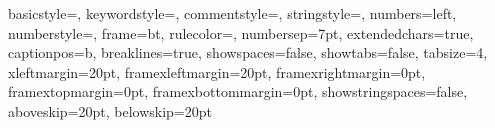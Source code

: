 
\lstset
{
    basicstyle=\footnotesize\ttfamily,
    keywordstyle=\color{blue}, %
    commentstyle=\color{OliveGreen},
    stringstyle=\color{BrickRed},
    numbers=left,
    numberstyle=\color{Gray}\tiny,
    frame=bt, %
    rulecolor=\color{Gray},
    numbersep=7pt,
    extendedchars=true,
    captionpos=b,
    breaklines=true,
    showspaces=false,
    showtabs=false,
    tabsize=4, 
    xleftmargin=20pt,
    framexleftmargin=20pt,
    framexrightmargin=0pt,
    framextopmargin=0pt,
    framexbottommargin=0pt,
    showstringspaces=false,
    aboveskip=20pt,
    belowskip=20pt
}



